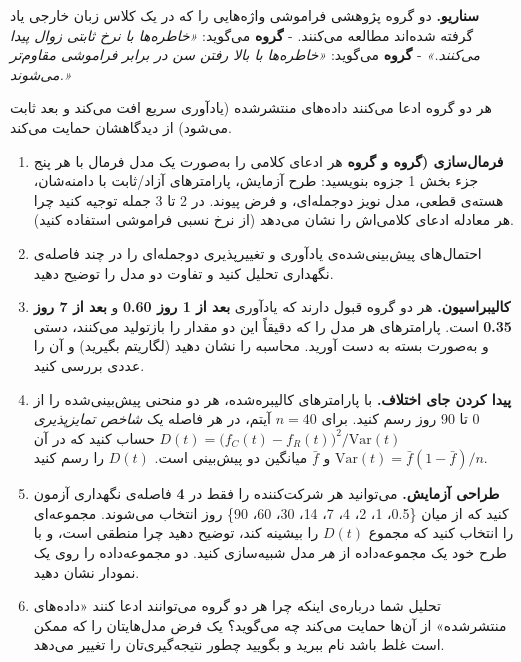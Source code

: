 \textbf{سناریو.} دو گروه پژوهشی فراموشی واژه‌هایی را که در یک کلاس زبان
خارجی یاد گرفته شده‌اند مطالعه می‌کنند. - \textbf{گروه } می‌گوید:
\emph{«خاطره‌ها با نرخ ثابتی زوال پیدا می‌کنند.»} - \textbf{گروه }
می‌گوید: \emph{«خاطره‌ها با بالا رفتن سن در برابر فراموشی مقاوم‌تر
می‌شوند.»}

هر دو گروه ادعا می‌کنند داده‌های منتشرشده (یادآوری سریع افت می‌کند و بعد
ثابت می‌شود) از دیدگاهشان حمایت می‌کند.

\begin{enumerate}
\def\labelenumi{\arabic{enumi}.}
\item
  \textbf{فرمال‌سازی (گروه  و گروه } هر ادعای کلامی را
  به‌صورت یک مدل فرمال با هر پنج جزء بخش 1 جزوه بنویسید: طرح آزمایش،
  پارامترهای آزاد/ثابت با دامنه‌شان، هسته‌ی قطعی، مدل نویز دوجمله‌ای، و فرض
  پیوند. در 2 تا 3 جمله توجیه کنید چرا هر معادله ادعای کلامی‌اش را نشان
  می‌دهد (از نرخ نسبی فراموشی استفاده کنید).
\item
  احتمال‌های پیش‌بینی‌شده‌ی یادآوری و تغییرپذیری دوجمله‌ای را در چند فاصله‌ی نگهداری تحلیل کنید و تفاوت دو مدل را توضیح دهید.
\item
  \textbf{کالیبراسیون.} هر دو گروه قبول دارند که یادآوری \textbf{بعد از
  1 روز 0.60} و \textbf{بعد از 7 روز 0.35} است. پارامترهای هر مدل را که
  دقیقاً این دو مقدار را بازتولید می‌کنند، دستی و به‌صورت بسته به دست
  آورید. محاسبه را نشان دهید (لگاریتم بگیرید) و آن را عددی بررسی کنید.
\item
  \textbf{پیدا کردن جای اختلاف.} با پارامترهای کالیبره‌شده، هر دو منحنی
  پیش‌بینی‌شده را از 0 تا 90 روز رسم کنید. برای \(n = 40\) آیتم، در هر
  فاصله یک \emph{شاخص تمایزپذیری}
  \(D(t) = \big(f_C(t) - f_R(t)\big)^2 / \mathrm{Var}(t)\) حساب کنید که
  در آن \(\mathrm{Var}(t) = \bar f(1 - \bar f)/n\) و \(\bar f\) میانگین
  دو پیش‌بینی است. \(D(t)\) را رسم کنید.
\item
  \textbf{طراحی آزمایش.} می‌توانید هر شرکت‌کننده را فقط در \textbf{4}
  فاصله‌ی نگهداری آزمون کنید که از میان \{0.5، 1، 2، 4، 7، 14، 30، 60،
  90\} روز انتخاب می‌شوند. مجموعه‌ای را انتخاب کنید که مجموع \(D(t)\) را
  بیشینه کند، توضیح دهید چرا منطقی است، و با طرح خود یک مجموعه‌داده از
  \emph{هر} مدل شبیه‌سازی کنید. دو مجموعه‌داده را روی یک نمودار نشان دهید.
\item
  تحلیل شما درباره‌ی اینکه چرا هر دو گروه می‌توانند ادعا کنند «داده‌های
  منتشرشده» از آن‌ها حمایت می‌کند چه می‌گوید؟ یک فرض مدل‌هایتان را که ممکن
  است غلط باشد نام ببرید و بگویید چطور نتیجه‌گیری‌تان را تغییر می‌دهد.
\end{enumerate}

